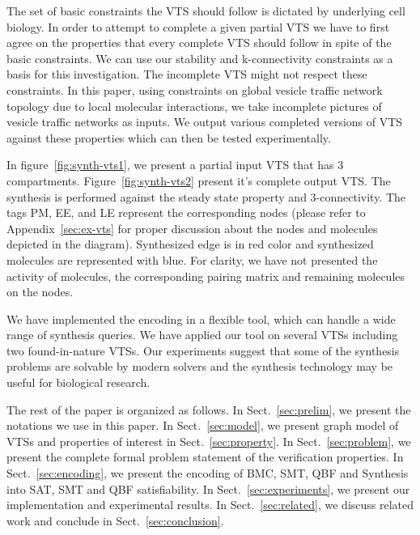 %
The set of basic constraints the VTS should follow is dictated by underlying cell biology.   
%
In order to attempt to complete a given partial VTS we have to first agree on the properties that every complete VTS should follow in spite of the basic constraints. 
%
We can use our stability and k-connectivity constraints as a basis for this investigation.   
%
The incomplete VTS might not respect these constraints. 
%
In this paper, using constraints on global vesicle traffic network topology due to local molecular interactions, we take incomplete pictures of vesicle traffic networks as inputs.
%
We output various completed versions of VTS against these properties which can then be tested experimentally.
%
\begin{example}
	In figure~\ref{fig:synth-vts1}, we present a partial input VTS that has 3 compartments. Figure~\ref{fig:synth-vts2} present it's complete output VTS. 
	The synthesis is performed against the steady state property and 3-connectivity. The tags PM, EE, and LE represent the corresponding nodes (please refer to Appendix~\ref{sec:ex-vts} for proper discussion about the nodes and molecules depicted in the diagram). 
	Synthesized edge is in red color and synthesized molecules are represented with blue.
	For clarity, we have not presented the activity of molecules, the corresponding pairing matrix and remaining molecules on the nodes.
	
\end{example}


We have implemented the encoding in a flexible tool, which can handle a wide range of synthesis queries. 
%
We have applied our tool on several VTSs including
two found-in-nature VTSs.
%
Our experiments suggest that some of the synthesis problems are solvable by modern solvers and the synthesis technology may be useful for biological research.
%

The rest of the paper is organized as follows. 
%
In Sect.~\ref{sec:prelim}, we present the notations we use in this paper. 
%
In Sect.~\ref{sec:model}, we present graph model of VTSs and  properties of interest in Sect.~\ref{sec:property}.
%
%
%
In Sect.~\ref{sec:problem}, we present the complete formal problem statement of the verification properties.
%
In Sect.~\ref{sec:encoding}, we present the encoding of BMC, SMT, QBF and Synthesis into SAT, SMT and QBF satisfiability. 
%
In Sect.~\ref{sec:experiments}, we present our implementation and experimental results. 
%
In Sect.~\ref{sec:related}, we discuss related work and conclude in Sect.~\ref{sec:conclusion}.
%
~        
